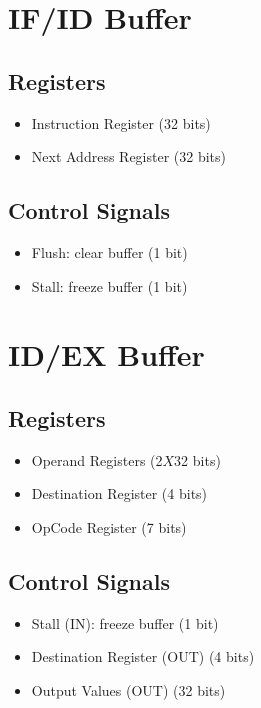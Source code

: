 \documentclass[12pt]{report}
\begin{document}
\section{IF/ID Buffer}

\subsection{Registers}
\begin{itemize}
    \item Instruction Register (32 bits)
    \item Next Address Register (32 bits)
\end{itemize}

\subsection{Control Signals}
\begin{itemize}
    \item Flush: clear buffer (1 bit)
    \item Stall: freeze buffer (1 bit)
\end{itemize}

\section{ID/EX Buffer}

\subsection{Registers}
\begin{itemize}
    \item Operand Registers (2$X$32 bits)
    \item Destination Register (4 bits)
    \item OpCode Register (7 bits)
\end{itemize}

\subsection{Control Signals}
\begin{itemize}
    \item Stall (IN): freeze buffer (1 bit)
    \item Destination Register (OUT) (4 bits)
    \item Output Values (OUT) (32 bits)
\end{itemize}
\end{document}
